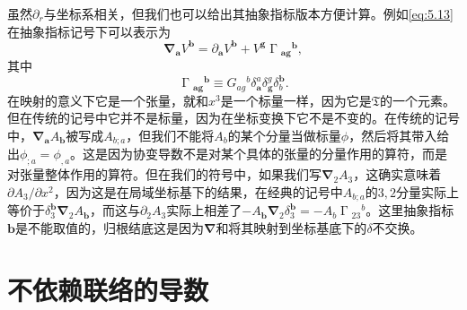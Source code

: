 虽然$\partial _{r}$与坐标系相关，但我们也可以给出其抽象指标版本方便计算。例如\ref{eq:5.13}在抽象指标记号下可以表示为
\begin{equation*}
	\boldsymbol{\nabla }_{\boldsymbol{a}} V^{\boldsymbol{b}} =\partial _{\boldsymbol{a}} V^{\boldsymbol{b}} +V^{\boldsymbol{g}} \upGamma {_{\boldsymbol{ag}}}^{\boldsymbol{b}} ,
\end{equation*}
其中
\begin{equation*}
	\upGamma {_{\boldsymbol{ag}}}^{\boldsymbol{b}} \equiv G{_{ag}}^{b} \delta _{\boldsymbol{a}}^{a} \delta _{\boldsymbol{g}}^{g} \delta _{b}^{\boldsymbol{b}} .
\end{equation*}
在映射的意义下它是一个张量，就和$x^{3}$是一个标量一样，因为它是$\mathfrak{T}$的一个元素。但在传统的记号中它并不是标量，因为在坐标变换下它不是不变的。在传统的记号中，$\boldsymbol{\nabla }_{\boldsymbol{a}} A_{\boldsymbol{b}}$被写成$A_{b;a}$，但我们不能将$A_{b}$的某个分量当做标量$\phi $，然后将其带入给出$\phi _{;a} =\phi _{,a}$。这是因为协变导数不是对某个具体的张量的分量作用的算符，而是对张量整体作用的算符。但在我们的符号中，如果我们写$\boldsymbol{\nabla }_{2} A_{3}$，这确实意味着$\partial A_{3} /\partial x^{2}$，因为这是在局域坐标基下的结果，在经典的记号中$A_{b;a}$的$3,2$分量实际上等价于$\delta _{3}^{\boldsymbol{b}}\boldsymbol{\nabla }_{2} A_{\boldsymbol{b}}$，而这与$\partial _{2} A_{3}$实际上相差了$-A_{\boldsymbol{b}}\boldsymbol{\nabla }_{2} \delta _{3}^{\boldsymbol{b}} =-A_{b} \upGamma {_{23}}^{b}$。这里抽象指标$\boldsymbol{b}$是不能取值的，归根结底这是因为$\boldsymbol{\nabla }$和将其映射到坐标基底下的$\delta $不交换。


\section{不依赖联络的导数}

